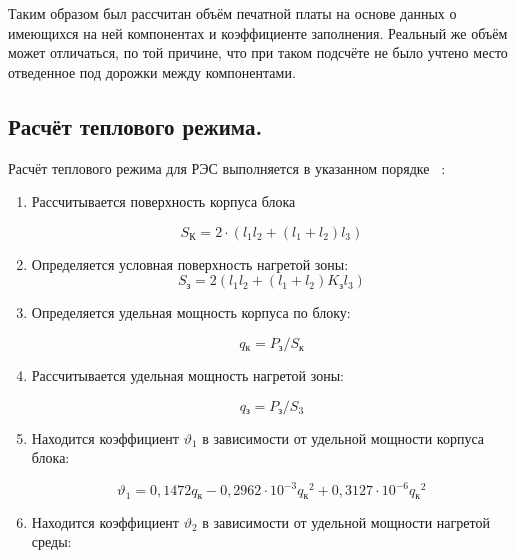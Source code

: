Таким образом был рассчитан объём печатной платы на основе данных о
имеющихся на ней компонентах и коэффициенте заполнения.
Реальный же объём может отличаться, по той причине, что при таком
подсчёте не было учтено место отведенное под дорожки между
компонентами.

\subsection{Расчёт теплового режима.} 
Расчёт теплового режима для РЭС выполняется в указанном порядке ~\cite{Rotkop1976}:
\begin{enumerate}
  
\item Рассчитывается поверхность корпуса блока

  \begin{equation}
    S\mathrm{_{К}} = 2 \cdot (l_1 l_2 + (l_1+ l_2)l_3) %
  \end{equation}

\item Определяется условная поверхность нагретой зоны:
  \begin{equation}
    S\mathrm{_{з}} = 2 (l_1 l_2 + (l_1 + l_2) K\mathrm{_{з}} l_3 ) %
  \end{equation}

\item Определяется удельная мощность корпуса по блоку:

\begin{equation}
  q\mathrm{_к} = P\mathrm{_з}/S\mathrm{_к} %
\end{equation}


\item Рассчитывается удельная мощность нагретой зоны:
  
  \begin{equation}
      q\mathrm{_з} = P\mathrm{_з}/S\mathrm{_3} %
    \end{equation}


\item Находится коэффициент $\vartheta_1$ в зависимости от удельной мощности корпуса блока:
    
\begin{equation}
\vartheta_1 = 0,1472q\mathrm{_к} - 0,2962 \cdot 10^{-3}q\mathrm{_к}^2 + 0,3127 \cdot 10^{-6}q\mathrm{_к}^2
\end{equation}

\item Находится коэффициент $\vartheta_2$ в зависимости от удельной мощности нагретой среды:


\end{enumerate}
